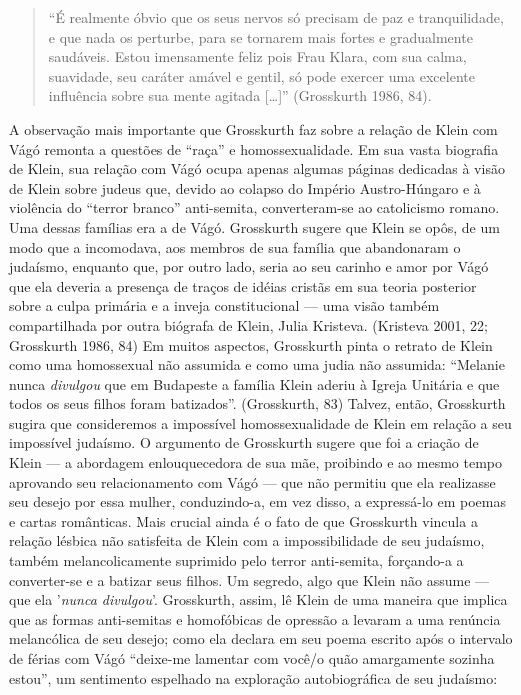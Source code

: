 \begin{quote}
``É realmente óbvio que os seus nervos só precisam de paz e
tranquilidade, e que nada os perturbe, para se tornarem mais fortes e
gradualmente saudáveis. Estou imensamente feliz pois Frau Klara, com sua
calma, suavidade, seu caráter amável e gentil, só pode exercer uma
excelente influência sobre sua mente agitada {[}\ldots{}{]}'' (Grosskurth
1986, 84).
\end{quote}

A observação mais importante que Grosskurth faz sobre a relação de Klein
com Vágó remonta a questões de ``raça'' e homossexualidade. Em sua vasta
biografia de Klein, sua relação com Vágó ocupa apenas algumas páginas
dedicadas à visão de Klein sobre judeus que, devido ao colapso do
Império Austro-Húngaro e à violência do ``terror branco'' anti-semita,
converteram-se ao catolicismo romano. Uma dessas famílias era a de Vágó.
Grosskurth sugere que Klein se opôs, de um modo que a incomodava, aos
membros de sua família que abandonaram o judaísmo, enquanto que, por
outro lado, seria ao seu carinho e amor por Vágó que ela deveria a
presença de traços de idéias cristãs em sua teoria posterior sobre a
culpa primária e a inveja constitucional --- uma visão também
compartilhada por outra biógrafa de Klein, Julia Kristeva. (Kristeva
2001, 22; Grosskurth 1986, 84) Em muitos aspectos, Grosskurth pinta o
retrato de Klein como uma homossexual não assumida e como uma judia não
assumida: ``Melanie nunca \emph{divulgou} que em Budapeste a família
Klein aderiu à Igreja Unitária e que todos os seus filhos foram
batizados''. (Grosskurth, 83) Talvez, então, Grosskurth sugira que
consideremos a impossível homossexualidade de Klein em relação a seu
impossível judaísmo. O argumento de Grosskurth sugere que foi a criação
de Klein --- a abordagem enlouquecedora de sua mãe, proibindo e ao mesmo
tempo aprovando seu relacionamento com Vágó --- que não permitiu que ela
realizasse seu desejo por essa mulher, conduzindo-a, em vez disso, a
expressá-lo em poemas e cartas românticas. Mais crucial ainda é o fato
de que Grosskurth vincula a relação lésbica não satisfeita de Klein com
a impossibilidade de seu judaísmo, também melancolicamente suprimido
pelo terror anti-semita, forçando-a a converter-se e a batizar seus
filhos. Um segredo, algo que Klein não assume --- que ela '\emph{nunca
divulgou}'. Grosskurth, assim, lê Klein de uma maneira que implica que
as formas anti-semitas e homofóbicas de opressão a levaram a uma
renúncia melancólica de seu desejo; como ela declara em seu poema
escrito após o intervalo de férias com Vágó ``deixe-me lamentar com
você/o quão amargamente sozinha estou'', um sentimento espelhado na
exploração autobiográfica de seu judaísmo:

